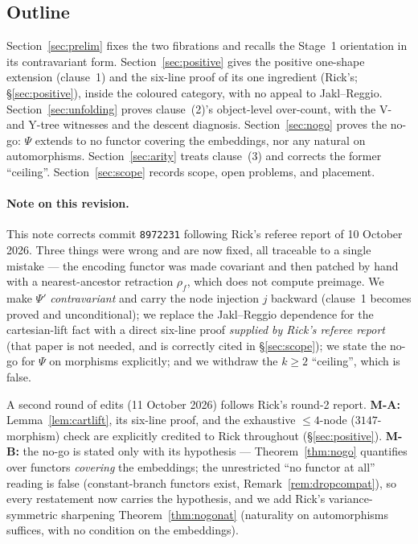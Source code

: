 \documentclass[11pt]{article}
\theoremstyle{definition}
\newcommand{\Psip}{\Psi'}
\begin{document}
\subsection*{Outline}

Section~\ref{sec:prelim} fixes the two fibrations and recalls the Stage~1 orientation in its
contravariant form. Section~\ref{sec:positive} gives the positive one-shape extension (clause~1) and
the six-line proof of its one ingredient (Rick's; \S\ref{sec:positive}), inside the coloured
category, with no appeal to Jakl--Reggio.
Section~\ref{sec:unfolding} proves clause~(2)'s object-level over-count, with the V- and Y-tree
witnesses and the descent diagnosis. Section~\ref{sec:nogo} proves the no-go: $\Psi$ extends to no
functor covering the embeddings, nor any natural on automorphisms. Section~\ref{sec:arity} treats clause~(3) and corrects the former ``ceiling''.
Section~\ref{sec:scope} records scope, open problems, and placement.

\paragraph{Note on this revision.}
This note corrects commit \texttt{8972231} following Rick's referee report of 10 October 2026. Three
things were wrong and are now fixed, all traceable to a single mistake --- the encoding functor was
made covariant and then patched by hand with a nearest-ancestor retraction $\rho_f$, which does not
compute preimage. We make $\Psip$ \emph{contravariant} and carry the node injection $j$ backward
(clause~1 becomes proved and unconditional); we replace the Jakl--Reggio dependence for the
cartesian-lift fact with a direct six-line proof \emph{supplied by Rick's referee report} (that
paper is not needed, and is correctly cited in \S\ref{sec:scope}); we state the no-go for $\Psi$ on
morphisms explicitly; and we withdraw the $k\ge2$ ``ceiling'', which is false.

A second round of edits (11 October 2026) follows Rick's round-2 report. \textbf{M-A:}
Lemma~\ref{lem:cartlift}, its six-line proof, and the exhaustive $\le4$-node ($3147$-morphism) check
are explicitly credited to Rick throughout (\S\ref{sec:positive}). \textbf{M-B:} the no-go is stated
only with its hypothesis --- Theorem~\ref{thm:nogo} quantifies over functors \emph{covering} the
embeddings; the unrestricted ``no functor at all'' reading is false (constant-branch functors exist,
Remark~\ref{rem:dropcompat}), so every restatement now carries the hypothesis, and we add Rick's
variance-symmetric sharpening Theorem~\ref{thm:nogonat} (naturality on automorphisms suffices, with
no condition on the embeddings).
\end{document}
